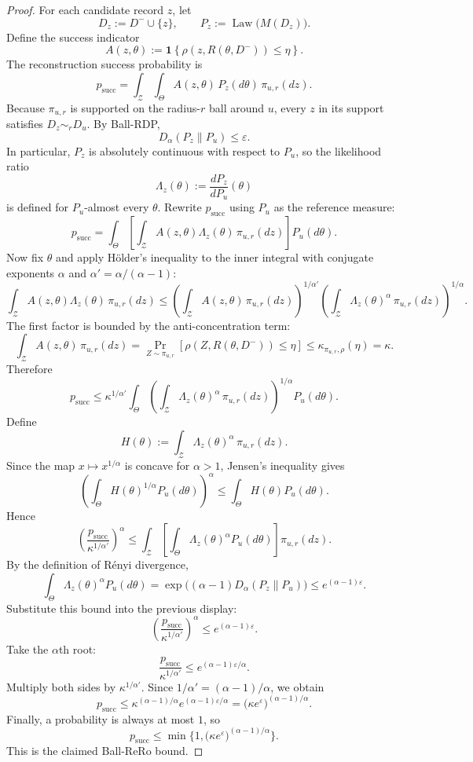 \documentclass[conference,compsoc]{IEEEtran}
\DeclareMathOperator{\Law}{Law}
\newcommand{\ind}[1]{\mathbf{1}\!\left\{#1\right\}}
\begin{document}
\begin{proof}
For each candidate record $z$, let
\[
D_z:=D^-\cup\{z\},
\qquad
P_z:=\Law\big(M(D_z)\big).
\]
Define the success indicator
\[
A(z,\theta):=\ind{\rho(z,R(\theta,D^-))\le \eta}.
\]
The reconstruction success probability is
\[
p_{\mathrm{succ}}
=
\int_{\mathcal{Z}}\int_{\Theta} A(z,\theta)\,P_z(d\theta)\,\pi_{u,r}(dz).
\]
Because $\pi_{u,r}$ is supported on the radius-$r$ ball around $u$, every $z$ in its support satisfies $D_z\sim_r D_u$. By Ball-RDP,
\[
D_\alpha(P_z\|P_u)\le \varepsilon.
\]
In particular, $P_z$ is absolutely continuous with respect to $P_u$, so the likelihood ratio
\[
\Lambda_z(\theta):=\frac{dP_z}{dP_u}(\theta)
\]
is defined for $P_u$-almost every $\theta$. Rewrite $p_{\mathrm{succ}}$ using $P_u$ as the reference measure:
\[
p_{\mathrm{succ}}
=
\int_{\Theta}
\left[
\int_{\mathcal{Z}} A(z,\theta)\Lambda_z(\theta)\,\pi_{u,r}(dz)
\right]
P_u(d\theta).
\]
Now fix $\theta$ and apply Hölder's inequality to the inner integral with conjugate exponents $\alpha$ and $\alpha' = \alpha/(\alpha-1)$:
\[
\int_{\mathcal{Z}} A(z,\theta)\Lambda_z(\theta)\,\pi_{u,r}(dz)
\le
\left(\int_{\mathcal{Z}} A(z,\theta)\,\pi_{u,r}(dz)\right)^{1/\alpha'}
\left(\int_{\mathcal{Z}} \Lambda_z(\theta)^\alpha\,\pi_{u,r}(dz)\right)^{1/\alpha}.
\]
The first factor is bounded by the anti-concentration term:
\[
\int_{\mathcal{Z}} A(z,\theta)\,\pi_{u,r}(dz)
=
\Pr_{Z\sim\pi_{u,r}}[\rho(Z,R(\theta,D^-))\le \eta]
\le
\kappa_{\pi_{u,r},\rho}(\eta)=\kappa.
\]
Therefore
\[
p_{\mathrm{succ}}
\le
\kappa^{1/\alpha'}
\int_{\Theta}
\left(\int_{\mathcal{Z}} \Lambda_z(\theta)^\alpha\,\pi_{u,r}(dz)\right)^{1/\alpha}
P_u(d\theta).
\]
Define
\[
H(\theta):=\int_{\mathcal{Z}} \Lambda_z(\theta)^\alpha\,\pi_{u,r}(dz).
\]
Since the map $x\mapsto x^{1/\alpha}$ is concave for $\alpha>1$, Jensen's inequality gives
\[
\left(
\int_{\Theta} H(\theta)^{1/\alpha}P_u(d\theta)
\right)^\alpha
\le
\int_{\Theta} H(\theta)P_u(d\theta).
\]
Hence
\[
\left(\frac{p_{\mathrm{succ}}}{\kappa^{1/\alpha'}}\right)^\alpha
\le
\int_{\mathcal{Z}}
\left[
\int_{\Theta} \Lambda_z(\theta)^\alpha P_u(d\theta)
\right]
\pi_{u,r}(dz).
\]
By the definition of Rényi divergence,
\[
\int_{\Theta} \Lambda_z(\theta)^\alpha P_u(d\theta)
=
\exp\big((\alpha-1)D_\alpha(P_z\|P_u)\big)
\le
 e^{(\alpha-1)\varepsilon}.
\]
Substitute this bound into the previous display:
\[
\left(\frac{p_{\mathrm{succ}}}{\kappa^{1/\alpha'}}\right)^\alpha
\le
 e^{(\alpha-1)\varepsilon}.
\]
Take the $\alpha$th root:
\[
\frac{p_{\mathrm{succ}}}{\kappa^{1/\alpha'}}
\le
 e^{(\alpha-1)\varepsilon/\alpha}.
\]
Multiply both sides by $\kappa^{1/\alpha'}$. Since $1/\alpha'=(\alpha-1)/\alpha$, we obtain
\[
p_{\mathrm{succ}}
\le
\kappa^{(\alpha-1)/\alpha}e^{(\alpha-1)\varepsilon/\alpha}
=
\big(\kappa e^{\varepsilon}\big)^{(\alpha-1)/\alpha}.
\]
Finally, a probability is always at most $1$, so
\[
p_{\mathrm{succ}}
\le
\min\Big\{1,\big(\kappa e^{\varepsilon}\big)^{(\alpha-1)/\alpha}\Big\}.
\]
This is the claimed Ball-ReRo bound.
\end{proof}
\end{document}
